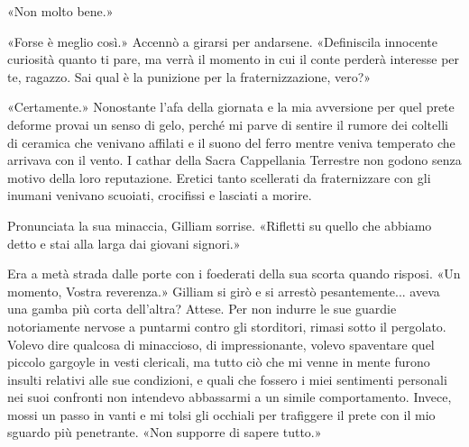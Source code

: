 «Non molto bene.»

«Forse è meglio così.» Accennò a girarsi per andarsene. «Definiscila
innocente curiosità quanto ti pare, ma verrà il momento in cui il conte
perderà interesse per te, ragazzo. Sai qual è la punizione per la
fraternizzazione, vero?»

«Certamente.» Nonostante l'afa della giornata e la mia avversione per
quel prete deforme provai un senso di gelo, perché mi parve di sentire
il rumore dei coltelli di ceramica che venivano affilati e il suono del
ferro mentre veniva temperato che arrivava con il vento. I cathar della
Sacra Cappellania Terrestre non godono senza motivo della loro
reputazione. Eretici tanto scellerati da fraternizzare con gli inumani
venivano scuoiati, crocifissi e lasciati a morire.

Pronunciata la sua minaccia, Gilliam sorrise. «Rifletti su quello che
abbiamo detto e stai alla larga dai giovani signori.»

Era a metà strada dalle porte con i foederati della sua scorta quando
risposi. «Un momento, Vostra reverenza.» Gilliam si girò e si arrestò
pesantemente... aveva una gamba più corta dell'altra? Attese. Per non
indurre le sue guardie notoriamente nervose a puntarmi contro gli
storditori, rimasi sotto il pergolato. Volevo dire qualcosa di
minaccioso, di impressionante, volevo spaventare quel piccolo gargoyle
in vesti clericali, ma tutto ciò che mi venne in mente furono insulti
relativi alle sue condizioni, e quali che fossero i miei sentimenti
personali nei suoi confronti non intendevo abbassarmi a un simile
comportamento. Invece, mossi un passo in vanti e mi tolsi gli occhiali
per trafiggere il prete con il mio sguardo più penetrante. «Non supporre
di sapere tutto.»

